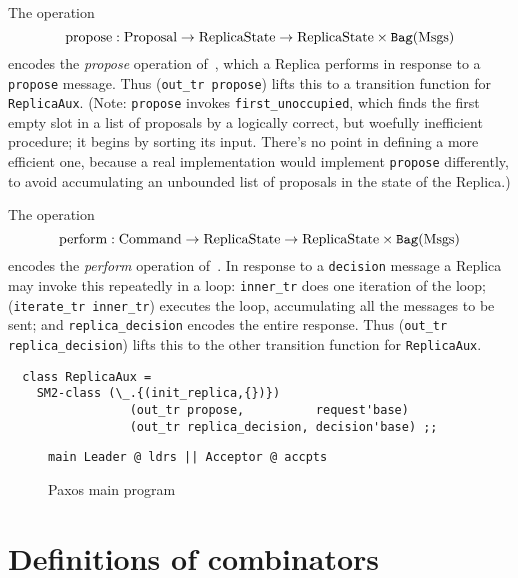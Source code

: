 \documentclass[final]{article}
\newcommand{\listinline}[1]{\text{\lstinline{#1}}}
\begin{document}
The operation
\[
\listinline{propose} :
   \NUPRLarrow{\listinline{Proposal}}
              {\NUPRLarrow{\listinline{ReplicaState}}
                          {\NUPRLprod{\listinline{ReplicaState}}
                                     {\NUPRLbag{\listinline{Msgs}}}}}
\]
encodes the \emph{propose} operation of~\cite{VanRenesse:2011}, which
a Replica performs in response to a \lstinline{propose} message.  Thus
(\lstinline{out_tr propose}) lifts this to a transition function for
\lstinline{ReplicaAux}.  (Note: \lstinline{propose} invokes
\lstinline{first_unoccupied}, which finds the first empty slot in a
list of proposals by a logically correct, but woefully inefficient
procedure; it begins by sorting its input.  There's no point in
defining a more efficient one, because a real implementation would
implement \lstinline{propose} differently, to avoid accumulating an
unbounded list of proposals in the state of the Replica.)

The operation
\[
\listinline{perform} :
   \NUPRLarrow{\listinline{Command}}
              {\NUPRLarrow{\listinline{ReplicaState}}
                          {\NUPRLprod{\listinline{ReplicaState}}
                                     {\NUPRLbag{\listinline{Msgs}}}}}
\]
encodes the \emph{perform} operation of~\cite{VanRenesse:2011}.  In response to a
\lstinline{decision} message a Replica may invoke this repeatedly in a
loop: \lstinline{inner_tr} does one iteration of the loop;
(\lstinline{iterate_tr inner_tr}) executes the loop, accumulating all
the messages to be sent; and \lstinline{replica_decision} encodes the
entire response.  Thus (\lstinline{out_tr replica_decision}) lifts
this to the other transition function for \lstinline{ReplicaAux}.

\begin{lstlisting}
  class ReplicaAux =
    SM2-class (\_.{(init_replica,{})})
                 (out_tr propose,          request'base)
                 (out_tr replica_decision, decision'base) ;;
\end{lstlisting}

\begin{figure}%
  \begin{lstlisting}[basicstyle=\small]
main Leader @ ldrs || Acceptor @ accpts
  \end{lstlisting}
  \caption{Paxos main program}
  \label{fig:Paxos-main-program}
\end{figure}

\section{Definitions of combinators}
\label{sec:combinators}
\end{document}
